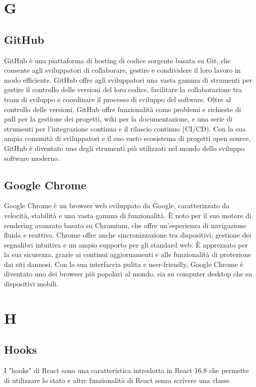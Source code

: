 \documentclass{article}
\begin{document}
\section{G}
\subsection{GitHub}
GitHub è una piattaforma di hosting di codice sorgente basata su Git, che consente agli sviluppatori di collaborare, gestire e condividere il loro lavoro in modo efficiente. GitHub offre agli sviluppatori una vasta gamma di strumenti per gestire il controllo delle versioni del loro codice, facilitare la collaborazione tra team di sviluppo e coordinare il processo di sviluppo del software. Oltre al controllo delle versioni, GitHub offre funzionalità come problemi e richieste di pull per la gestione dei progetti, wiki per la documentazione, e una serie di strumenti per l'integrazione continua e il rilascio continuo (CI/CD). Con la sua ampia comunità di sviluppatori e il suo vasto ecosistema di progetti open source, GitHub è diventato uno degli strumenti più utilizzati nel mondo dello sviluppo software moderno.

\subsection{Google Chrome}
Google Chrome è un browser web sviluppato da Google, caratterizzato da velocità, stabilità e una vasta gamma di funzionalità. È noto per il suo motore di rendering avanzato basato su Chromium, che offre un'esperienza di navigazione fluida e reattiva. Chrome offre anche sincronizzazione tra dispositivi, gestione dei segnalibri intuitiva e un ampio supporto per gli standard web. È apprezzato per la sua sicurezza, grazie ai continui aggiornamenti e alle funzionalità di protezione dai siti dannosi. Con la sua interfaccia pulita e user-friendly, Google Chrome è diventato uno dei browser più popolari al mondo, sia su computer desktop che su dispositivi mobili.

\section{H}
\subsection{Hooks}
I "hooks" di React sono una caratteristica introdotta in React 16.8 che permette di utilizzare lo stato e altre funzionalità di React senza scrivere una classe.
\end{document}

